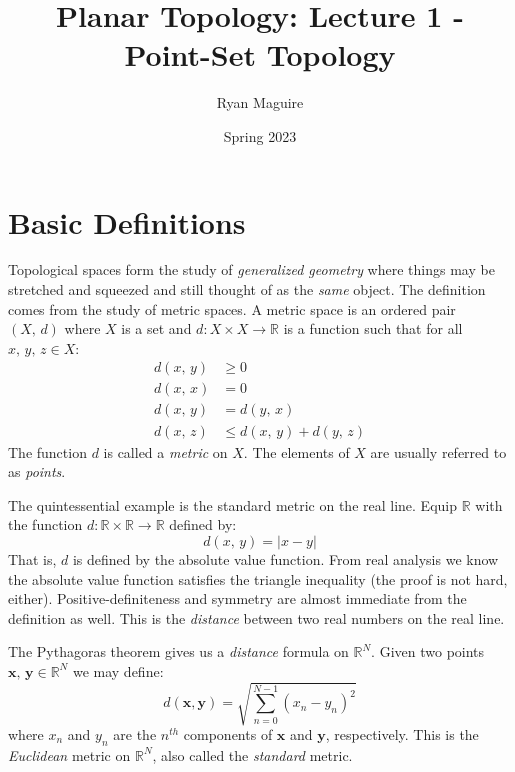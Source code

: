 \documentclass{article}
\title{Planar Topology: Lecture 1 - Point-Set Topology}
\author{Ryan Maguire}
\date{Spring 2023}
\theoremstyle{plain}
\theoremstyle{normal}
\newenvironment{example}{%
    \pushQED{\qed}\renewcommand{\qedsymbol}{$\blacksquare$}\examplex%
}{%
    \popQED\endexamplex%
}
\newenvironment{definition}{%
    \pushQED{\qed}\renewcommand{\qedsymbol}{$\blacksquare$}\definitionx%
}{%
    \popQED\enddefinitionx%
}
\begin{document}
    \maketitle
    \tableofcontents
    \listoffigures
    \section{Basic Definitions}
        Topological spaces form the study of \textit{generalized geometry}
        where things may be stretched and squeezed and still thought of as the
        \textit{same} object. The definition comes from the study of metric
        spaces.
        \begin{definition}[Metric Space]
            A metric space is an ordered pair $(X,\,d)$ where $X$ is a set and
            $d:X\times{X}\rightarrow\mathbb{R}$ is a function such that for all
            $x,\,y,\,z\in{X}$:
            \begin{align}
                d(x,\,y)&\geq{0}\tag{Positivity}\\
                d(x,\,x)&=0\tag{Definiteness}\\
                d(x,\,y)&=d(y,\,x)\tag{Symmetry}\\
                d(x,\,z)&\leq{d}(x,\,y)+d(y,\,z)\tag{Triangle Inequality}
            \end{align}
            The function $d$ is called a \textit{metric} on $X$. The elements of
            $X$ are usually referred to as \textit{points}.
        \end{definition}
        \begin{example}
            The quintessential example is the standard metric on the real line.
            Equip $\mathbb{R}$ with the function
            $d:\mathbb{R}\times\mathbb{R}\rightarrow\mathbb{R}$ defined by:
            \begin{equation}
                d(x,\,y)=|x-y|
            \end{equation}
            That is, $d$ is defined by the absolute value function. From real
            analysis we know the absolute value function satisfies the triangle
            inequality (the proof is not hard, either). Positive-definiteness
            and symmetry are almost immediate from the definition as well.
            This is the \textit{distance} between two real numbers on the
            real line.
        \end{example}
        \begin{example}
            The Pythagoras theorem gives us a \textit{distance} formula on
            $\mathbb{R}^{N}$. Given two points
            $\mathbf{x},\,\mathbf{y}\in\mathbb{R}^{N}$ we may define:
            \begin{equation}
                d(\mathbf{x},\mathbf{y})
                =\sqrt{\sum_{n=0}^{N-1}(x_{n}-y_{n})^{2}}
            \end{equation}
            where $x_{n}$ and $y_{n}$ are the $n^{th}$ components of
            $\mathbf{x}$ and $\mathbf{y}$, respectively. This is the
            \textit{Euclidean} metric on $\mathbb{R}^{N}$, also called the
            \textit{standard} metric.
        \end{example}
\end{document}
